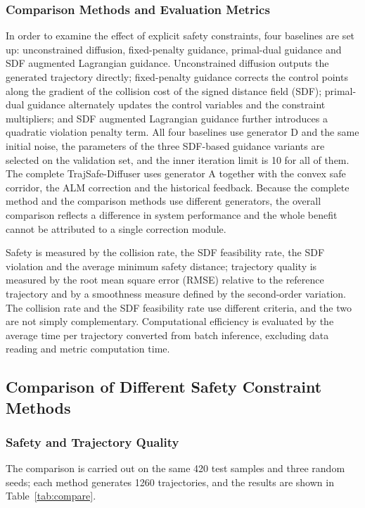 \documentclass[journal]{IEEEtran}
\begin{document}
\subsubsection{Comparison Methods and Evaluation Metrics}

In order to examine the effect of explicit safety constraints, four baselines are set up: unconstrained diffusion, fixed-penalty guidance, primal-dual guidance and SDF augmented Lagrangian guidance. Unconstrained diffusion outputs the generated trajectory directly; fixed-penalty guidance corrects the control points along the gradient of the collision cost of the signed distance field (SDF); primal-dual guidance alternately updates the control variables and the constraint multipliers; and SDF augmented Lagrangian guidance further introduces a quadratic violation penalty term. All four baselines use generator D and the same initial noise, the parameters of the three SDF-based guidance variants are selected on the validation set, and the inner iteration limit is 10 for all of them. The complete TrajSafe-Diffuser uses generator A together with the convex safe corridor, the ALM correction and the historical feedback. Because the complete method and the comparison methods use different generators, the overall comparison reflects a difference in system performance and the whole benefit cannot be attributed to a single correction module.

Safety is measured by the collision rate, the SDF feasibility rate, the SDF violation and the average minimum safety distance; trajectory quality is measured by the root mean square error (RMSE) relative to the reference trajectory and by a smoothness measure defined by the second-order variation. The collision rate and the SDF feasibility rate use different criteria, and the two are not simply complementary. Computational efficiency is evaluated by the average time per trajectory converted from batch inference, excluding data reading and metric computation time.

\subsection{Comparison of Different Safety Constraint Methods}

\subsubsection{Safety and Trajectory Quality}

The comparison is carried out on the same 420 test samples and three random seeds; each method generates 1260 trajectories, and the results are shown in Table~\ref{tab:compare}.
\end{document}
